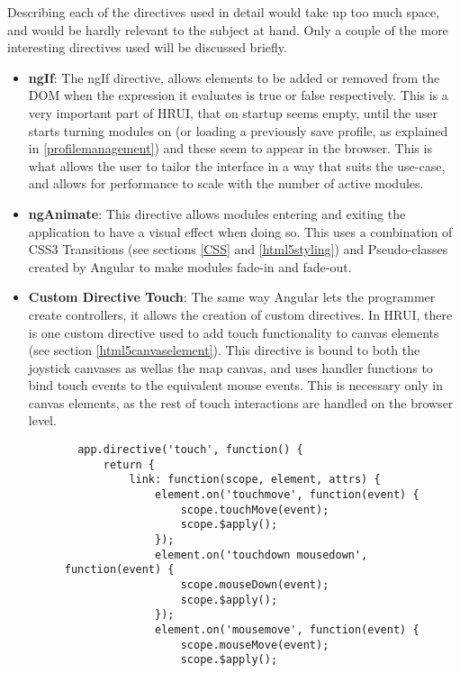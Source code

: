 Describing each of the directives used in detail would take up too much space, and would be hardly relevant to the subject at hand. Only
a couple of the more interesting directives used will be discussed briefly.
\begin{itemize}
  \item \textbf{ngIf}: The ngIf directive, allows elements to be added or removed from the DOM when the expression it evaluates is true
  or false respectively. This is a very important part of HRUI, that on startup seems empty, until the user starts turning modules on 
  (or loading a previously save profile, as explained in \ref{profilemanagement}) and these seem to appear in the browser. This is what
  allows the user to tailor the interface in a way that suits the use-case, and allows for performance to scale with the number of
  active modules.
  \item \textbf{ngAnimate}: This directive allows modules entering and exiting the application to have a visual effect when doing so.
  This uses a combination of CSS3 Transitions (see sections \ref{CSS} and \ref{html5styling}) and Pseudo-classes created by Angular to
  make modules fade-in and fade-out.
  \item \textbf{Custom Directive Touch}: The same way Angular lets the programmer create controllers, it allows the creation of custom
  directives. In HRUI, there is one custom directive used to add touch functionality to canvas elements (see section
  \ref{html5canvaselement}). This directive is bound to both the joystick canvases as wellas the map canvas, and uses handler functions
  to bind touch events to the equivalent mouse events. This is necessary only in canvas elements, as the rest of touch interactions are
  handled on the browser level.
  \begin{figure}[H]
  \centering
  \captionsetup{justification=centering}
  \begin{verbatim}
  app.directive('touch', function() {
      return {
          link: function(scope, element, attrs) {
              element.on('touchmove', function(event) {
                  scope.touchMove(event);
                  scope.$apply();
              });
              element.on('touchdown mousedown', function(event) {
                  scope.mouseDown(event);
                  scope.$apply();
              });
              element.on('mousemove', function(event) {
                  scope.mouseMove(event);
                  scope.$apply();

\end{verbatim}
\end{figure}
\end{itemize}
